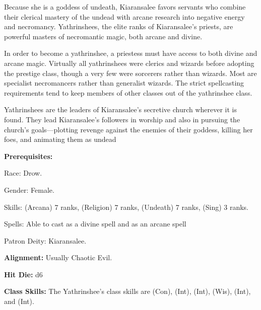 
Because she is a goddess of undeath, Kiaransalee favors servants who combine their clerical mastery of the undead with arcane research into negative energy and necromancy. Yathrinshees, the elite ranks of Kiaransalee’s priests, are powerful masters of necromantic magic, both arcane and divine.

In order to become a yathrinshee, a priestess must have access to both divine and arcane magic. Virtually all yathrinshees were clerics and wizards before adopting the prestige class, though a very few were sorcerers rather than wizards. Most are specialist necromancers rather than generalist wizards. The strict spellcasting requirements tend to keep members of other classes out of the yathrinshee class.

Yathrinshees are the leaders of Kiaransalee’s secretive church wherever it is found. They lead Kiaransalee’s followers in worship and also in pursuing the church’s goals—plotting revenge against
the enemies of their goddess, killing her foes, and animating them as undead

\textbf{Prerequisites:} 
\begin{description*}
\item[\hspace*{1.4cm}Race:] Drow.
\item[\hspace*{1.4cm}Gender:] Female.
\item[\hspace*{1.4cm}Skills:]  (Arcana) 7 ranks,  (Religion) 7 ranks,  (Undeath) 7 ranks,  (Sing) 3 ranks.
\item[\hspace*{1.4cm}Spells:] Able to cast  as a divine spell and  as an arcane spell
\item[\hspace*{1.4cm}Patron Deity:] Kiaransalee.
\end{description*}

\textbf{Alignment:} Usually Chaotic Evil.

\textbf{Hit Die:} d6

\textbf{Class Skills:} The Yathrinshee's class skills are  (Con),  (Int),  (Int),  (Wis),  (Int), and  (Int).

